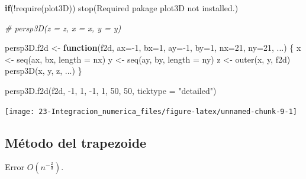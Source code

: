 \documentclass[
]{book}
\newenvironment{Shaded}{\begin{snugshade}}{\end{snugshade}}
\newcommand{\AttributeTok}[1]{\textcolor[rgb]{0.77,0.63,0.00}{#1}}
\newcommand{\CommentTok}[1]{\textcolor[rgb]{0.56,0.35,0.01}{\textit{#1}}}
\newcommand{\ControlFlowTok}[1]{\textcolor[rgb]{0.13,0.29,0.53}{\textbf{#1}}}
\newcommand{\DecValTok}[1]{\textcolor[rgb]{0.00,0.00,0.81}{#1}}
\newcommand{\FunctionTok}[1]{\textcolor[rgb]{0.00,0.00,0.00}{#1}}
\newcommand{\NormalTok}[1]{#1}
\newcommand{\OtherTok}[1]{\textcolor[rgb]{0.56,0.35,0.01}{#1}}
\newcommand{\SpecialCharTok}[1]{\textcolor[rgb]{0.00,0.00,0.00}{#1}}
\newcommand{\StringTok}[1]{\textcolor[rgb]{0.31,0.60,0.02}{#1}}
\theoremstyle{break}
\theoremstyle{nonumberplain}
\begin{document}
\begin{Shaded}
\begin{Highlighting}[]
\ControlFlowTok{if}\NormalTok{(}\SpecialCharTok{!}\FunctionTok{require}\NormalTok{(plot3D)) }\FunctionTok{stop}\NormalTok{(}\StringTok{\textquotesingle{}Required pakage \textasciigrave{}plot3D\textasciigrave{} not installed.\textquotesingle{}}\NormalTok{)}

\CommentTok{\# persp3D(z = z, x = x, y = y)}

\NormalTok{persp3D.f2d }\OtherTok{\textless{}{-}} \ControlFlowTok{function}\NormalTok{(f2d, }\AttributeTok{ax=}\SpecialCharTok{{-}}\DecValTok{1}\NormalTok{, }\AttributeTok{bx=}\DecValTok{1}\NormalTok{, }\AttributeTok{ay=}\SpecialCharTok{{-}}\DecValTok{1}\NormalTok{, }\AttributeTok{by=}\DecValTok{1}\NormalTok{, }\AttributeTok{nx=}\DecValTok{21}\NormalTok{, }\AttributeTok{ny=}\DecValTok{21}\NormalTok{, ...) \{ }
\NormalTok{  x }\OtherTok{\textless{}{-}} \FunctionTok{seq}\NormalTok{(ax, bx, }\AttributeTok{length =}\NormalTok{ nx)}
\NormalTok{  y }\OtherTok{\textless{}{-}} \FunctionTok{seq}\NormalTok{(ay, by, }\AttributeTok{length =}\NormalTok{ ny)}
\NormalTok{  z }\OtherTok{\textless{}{-}} \FunctionTok{outer}\NormalTok{(x, y, f2d)}
  \FunctionTok{persp3D}\NormalTok{(x, y, z, ...)}
\NormalTok{\}}

\FunctionTok{persp3D.f2d}\NormalTok{(f2d, }\SpecialCharTok{{-}}\DecValTok{1}\NormalTok{, }\DecValTok{1}\NormalTok{, }\SpecialCharTok{{-}}\DecValTok{1}\NormalTok{, }\DecValTok{1}\NormalTok{, }\DecValTok{50}\NormalTok{, }\DecValTok{50}\NormalTok{, }\AttributeTok{ticktype =} \StringTok{"detailed"}\NormalTok{) }
\end{Highlighting}
\end{Shaded}

\begin{center}\texttt{[image: 23-Integracion\_numerica\_files/figure-latex/unnamed-chunk-9-1]} \end{center}

\hypertarget{muxe9todo-del-trapezoide-1}{%
\subsection{Método del trapezoide}\label{muxe9todo-del-trapezoide-1}}

Error \(O(n^{-\frac{2}{d}})\).
\end{document}
